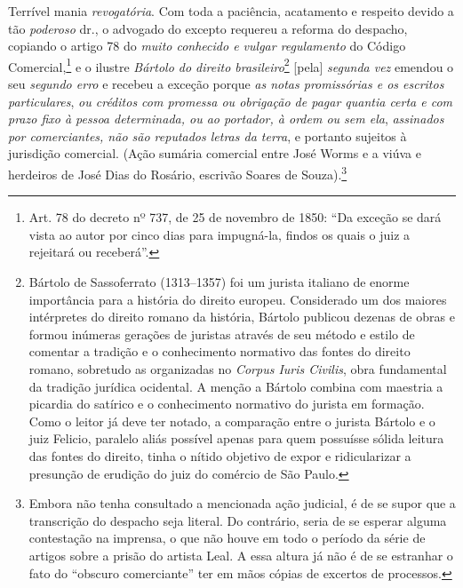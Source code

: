 Terrível mania \emph{revogatória}. Com toda a paciência, acatamento e
respeito devido a tão \emph{poderoso} dr., o advogado do excepto
requereu a reforma do despacho, copiando o artigo 78 do \emph{muito
conhecido e vulgar regulamento} do Código Comercial,\footnote{ Art. 78
  do decreto nº 737, de 25 de novembro de 1850: ``Da exceção se dará vista ao autor
  por cinco dias para impugná-la, findos os quais o juiz a rejeitará ou
  receberá''.} e o ilustre \emph{Bártolo do direito
brasileiro}\footnote{ Bártolo de Sassoferrato (1313--1357) foi um
  jurista italiano de enorme importância para a história do direito
  europeu. Considerado um dos maiores intérpretes do direito romano da
  história, Bártolo publicou dezenas de obras e formou inúmeras gerações
  de juristas através de seu método e estilo de comentar a tradição e o
  conhecimento normativo das fontes do direito romano, sobretudo as
  organizadas no \emph{Corpus Iuris Civilis}, obra fundamental da
  tradição jurídica ocidental. A menção a Bártolo combina com maestria a
  picardia do satírico e o conhecimento normativo do jurista em
  formação. Como o leitor já deve ter notado, a comparação entre o
  jurista Bártolo e o juiz Felicio, paralelo aliás possível apenas para
  quem possuísse sólida leitura das fontes do direito, tinha o nítido
  objetivo de expor e ridicularizar a presunção de erudição do juiz do
  comércio de São Paulo.} {[}pela{]} \emph{segunda vez} emendou o seu
\emph{segundo erro} e recebeu a exceção porque \emph{as notas
promissórias e os escritos particulares}, \emph{ou créditos com promessa
ou obrigação de pagar quantia certa e com prazo fixo à pessoa
determinada, ou ao portador, à ordem ou sem ela}, \emph{assinados por
comerciantes, não são reputados letras da terra}, e portanto sujeitos à
jurisdição comercial. (Ação sumária comercial entre José Worms e a viúva
e herdeiros de José Dias do Rosário, escrivão Soares de
Souza).\footnote{ Embora não tenha consultado a mencionada ação
  judicial, é de se supor que a transcrição do despacho seja literal. Do
  contrário, seria de se esperar alguma contestação na imprensa, o que
  não houve em todo o período da série de artigos sobre a prisão do
  artista Leal. A essa altura já não é de se estranhar o fato do
  ``obscuro comerciante'' ter em mãos cópias de excertos de processos.}

